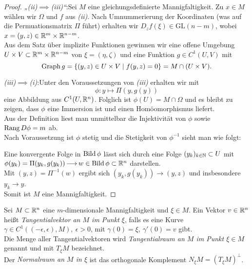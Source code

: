 \documentclass[skript.tex]{subfiles}
\begin{document}
\begin{proof}
		\emph{„(ii)$\implies$(iii)“}:\quad Sei $M$ eine gleichungsdefinierte Mannigfaltigkeit. Zu $x \in M$ wählen wir $\Omega$ und $f$ aus \emph{(ii)}. Nach Umnummerierung der Koordinaten (was auf die Permuationsmatrix $\Pi$ führt) erhalten wir $D_z f(\xi)\in\mathrm{GL}(n-m)$, wobei $x=(y,z)\in\mathbb{R}^m\times\mathbb{R}^{n-m}$.\\
		Aus dem Satz über implizite Funktionen gewinnen wir eine offene Umgebung\\$U \times V \subset \mathbb{R}^m\times\mathbb{R}^{n-m}$ von $\xi = (\eta,\zeta)$ und eine Funktion $g \in C^1(U,V)$ mit
		\[
			\operatorname{Graph} g = \{(y,z) \in U \times V \mid f(y,z) = 0\} = M \cap (U \times V).
		\]
		
		\emph{(iii)$\implies$(i)}:\quad Unter den Voraussetzungen von \emph{(iii)} erhalten wir mit
		\[
			\phi \colon y \mapsto \Pi(y,g(y))
		\]
		eine Abbildung aus $C^1(U,\mathbb{R}^n)$. Folglich ist $\phi(U)=M\cap\Omega$ und es bleibt zu zeigen, dass $\phi$ eine Immersion ist und einen Homöomorphismus liefert.\\
		Aus der Definition liest man unmittelbar die Injektivität von $\phi$ sowie $\operatorname{\operatorname{Rang}} D\phi=m$ ab.\\Nach Voraussetzung ist $\phi$ stetig und die Stetigkeit von $\phi^{-1}$ sieht man wie folgt:
		
		Eine konvergente Folge in $\operatorname{Bild}\phi$ lässt sich durch eine Folge $(y_k)_{k\in\mathbb{N}}\subset U$ mit\\
		$\phi(y_k) = \Pi(y_k,g(y_k))\kern -1pt \longrightarrow \kern -1pt w\in\operatorname{Bild}\phi\subset\mathbb{R}^n$
		darstellen.\\
		Mit $(y,z)=\Pi^{-1}(w)$
		ergibt sich $(y_k,g(y_k)) \to (y,z)$ und insbesondere $y_k\to y$.\\
		Somit ist $M$ eine Mannigfaltigkeit.
	\end{proof}
	
	\begin{defin}
		Sei $M \subset \mathbb{R}^n$ eine $m$-dimensionale Mannigfaltigkeit und $\xi \in M$. Ein Vektor $v \in \mathbb{R}^n$ heißt \emph{Tangentialvektor an $M$ im Punkt $\xi$}, falls es eine Kurve $\gamma \in C^1((-\epsilon,\epsilon),M),\ \epsilon>0$, mit $\gamma(0)=\xi,\ \gamma'(0) = v$ gibt.\\
		Die Menge aller Tangentialvektoren wird \emph{Tangentialraum an $M$ im Punkt $\xi \in M$} genannt und mit $T_\xi M$ bezeichnet.\\
		Der \emph{Normalraum an $M$ in $\xi$} ist das orthogonale Komplement $N_\xi M = (T_\xi M)^\perp$.
	\end{defin}
\end{document}
